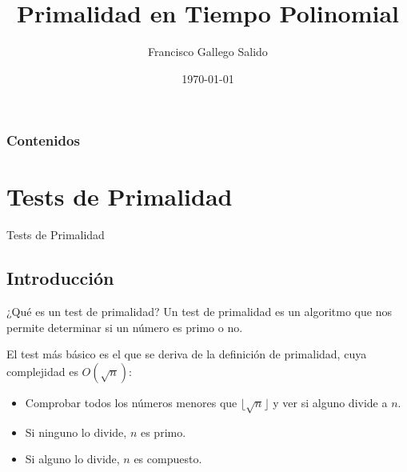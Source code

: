 \documentclass{beamer}
\title[Primalidad en Tiempo Polinomial]{Primalidad en Tiempo Polinomial} %
\author{Francisco Gallego Salido} %
\institute[UGR] %
{
  Universidad de Granada \\ %
  \medskip
  \textit{fgallego@correo.ugr.es} %
}
\date{\today} %
\begin{document}
\begin{frame}
\titlepage %
\end{frame}

\begin{frame}
  \frametitle{Contenidos} %
  \tableofcontents
\end{frame}




\section{Tests de Primalidad}

\begin{frame}
	\centering
	\begin{Huge}
		Tests de Primalidad
	\end{Huge}
\end{frame}

\subsection{Introducción}

\begin{frame}{¿Qué es un test de primalidad?}
	Un test de primalidad es un algoritmo que nos permite determinar si un número es primo o no.\break
	
	El test más básico es el que se deriva de la definición de primalidad, cuya complejidad es $O(\sqrt{n})$:
	
	\begin{itemize}[<+(1)->]
		\item Comprobar todos los números menores que $\lfloor\sqrt{n}\rfloor$ y ver si alguno divide a $n$.
		
		\item Si ninguno lo divide, $n$ es primo.
		
		\item Si alguno lo divide, $n$ es compuesto.
	\end{itemize}
\end{frame}
\end{document}
